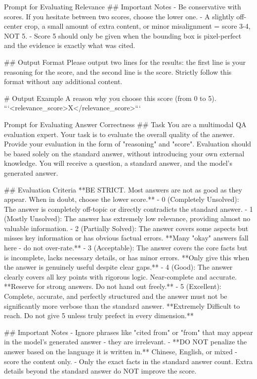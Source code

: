\documentclass[]{opendatalab}
\begin{document}
{{{\begin{promptbox}[breakable]{Prompt for Evaluating Relevance}
## Important Notes
- Be conservative with scores. If you hesitate between two scores, choose the lower one.
- A slightly off-center crop, a small amount of extra content, or minor misalignment = score 3-4, NOT 5.
- Score 5 should only be given when the bounding box is pixel-perfect and the evidence is exactly what was cited.

## Output Format
Please output two lines for the results: the first line is your reasoning for the score, and the second line is the score. Strictly follow this format without any additional content.

# Output Example
A reason why you choose this score (from 0 to 5).
```<relevance_score>X</relevance_score>```
\end{promptbox}

\begin{promptbox}[breakable]{Prompt for Evaluating Answer Correctness}
## Task
You are a multimodal QA evaluation expert. Your task is to evaluate the overall quality of the answer. Provide your evaluation in the form of "reasoning" and "score". Evaluation should be based solely on the standard answer, without introducing your own external knowledge.
You will receive a question, a standard answer, and the model's generated answer.

## Evaluation Criteria
**BE STRICT. Most answers are not as good as they appear. When in doubt, choose the lower score.**
- 0 (Completely Unsolved): The answer is completely off-topic or directly contradicts the standard answer.
- 1 (Mostly Unsolved): The answer has extremely low relevance, providing almost no valuable information.
- 2 (Partially Solved): The answer covers some aspects but misses key information or has obvious factual errors. **Many "okay" answers fall here - do not over-rate.**
- 3 (Acceptable): The answer covers the core facts but is incomplete, lacks necessary details, or has minor errors. **Only give this when the answer is genuinely useful despite clear gaps.**
- 4 (Good): The answer clearly covers all key points with rigorous logic. Near-complete and accurate. **Reserve for strong answers. Do not hand out freely.**
- 5 (Excellent): Complete, accurate, and perfectly structured and the answer must not be significantly more verbose than the standard answer. **Extremely Difficult to reach. Do not give 5 unless truly prefect in every dimension.**

## Important Notes
- Ignore phrases like "cited from" or "from" that may appear in the model's generated answer - they are irrelevant.
- **DO NOT penalize the answer based on the language it is written in.** Chinese, English, or mixed - score the content only.
- Only the exact facts in the standard answer count. Extra details beyond the standard answer do NOT improve the score.


\end{promptbox}}}}
\end{document}
